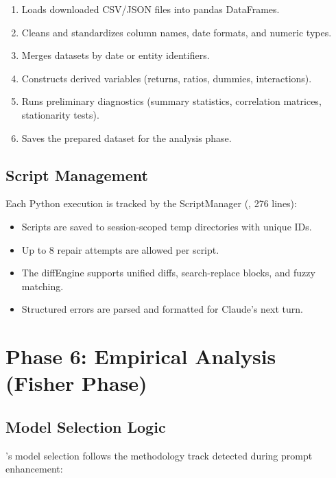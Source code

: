 \begin{enumerate}
  \item Loads downloaded CSV/JSON files into pandas DataFrames.
  \item Cleans and standardizes column names, date formats, and numeric types.
  \item Merges datasets by date or entity identifiers.
  \item Constructs derived variables (returns, ratios, dummies, interactions).
  \item Runs preliminary diagnostics (summary statistics, correlation matrices, stationarity tests).
  \item Saves the prepared dataset for the analysis phase.
\end{enumerate}

\subsection{Script Management}

Each Python execution is tracked by the ScriptManager (, 276 lines):

\begin{itemize}
  \item Scripts are saved to session-scoped temp directories with unique IDs.
  \item Up to 8 repair attempts are allowed per script.
  \item The diffEngine supports unified diffs, search-replace blocks, and fuzzy matching.
  \item Structured errors are parsed and formatted for Claude's next turn.
\end{itemize}

\section{Phase 6: Empirical Analysis (Fisher Phase)}
\label{sec:pipeline:analysis}

\subsection{Model Selection Logic}

\fisher's model selection follows the methodology track detected during prompt enhancement:

